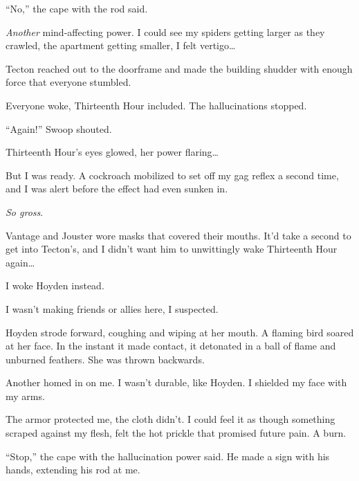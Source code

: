 ``No,'' the cape with the rod said.



\emph{Another} mind-affecting power.  I could see my spiders getting larger as they crawled, the apartment getting smaller, I felt vertigo\ldots



Tecton reached out to the doorframe and made the building shudder with enough force that everyone stumbled.



Everyone woke, Thirteenth Hour included.  The hallucinations stopped.



``Again!'' Swoop shouted.



Thirteenth Hour's eyes glowed, her power flaring\ldots



But I was ready.  A cockroach mobilized to set off my gag reflex a second time, and I was alert before the effect had even sunken in.



\emph{So gross}.



Vantage and Jouster wore masks that covered their mouths.  It'd take a second to get into Tecton's, and I didn't want him to unwittingly wake Thirteenth Hour again\ldots



I woke Hoyden instead.



I wasn't making friends or allies here, I suspected.



Hoyden strode forward, coughing and wiping at her mouth.  A flaming bird soared at her face.  In the instant it made contact, it detonated in a ball of flame and unburned feathers.  She was thrown backwards.



Another homed in on me.  I wasn't durable, like Hoyden.  I shielded my face with my arms.



The armor protected me, the cloth didn't.  I could feel it as though something scraped against my flesh, felt the hot prickle that promised future pain.  A burn.



``Stop,'' the cape with the hallucination power said.  He made a sign with his hands, extending his rod at me.



